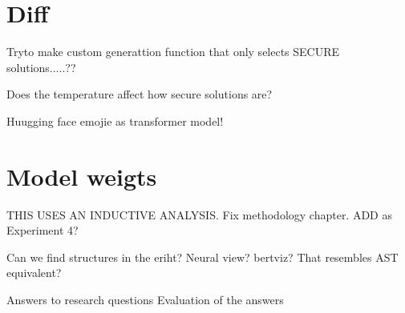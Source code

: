 \section{Diff}

Tryto make custom generattion function that only selects SECURE solutions.....??

Does the temperature affect how secure solutions are?


Huugging face emojie as transformer model!


\section{Model weigts}
THIS USES AN INDUCTIVE ANALYSIS. Fix methodology chapter. ADD as Experiment 4?

Can  we  find structures in the eriht? Neural  view? bertviz? That resembles AST equivalent?

Answers to research questions
Evaluation of the answers